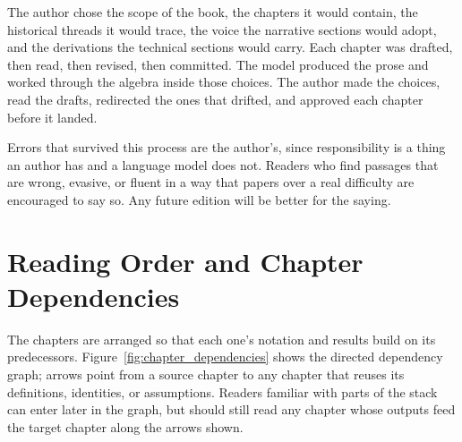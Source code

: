 \documentclass[11pt,a4paper,openany]{book}
\begin{document}
The author chose the scope of the book, the chapters it would
contain, the historical threads it would trace, the voice the
narrative sections would adopt, and the derivations the technical
sections would carry. Each chapter was drafted, then read, then
revised, then committed. The model produced the prose and worked
through the algebra inside those choices. The author made the
choices, read the drafts, redirected the ones that drifted, and
approved each chapter before it landed.

Errors that survived this process are the author's, since
responsibility is a thing an author has and a language model does
not. Readers who find passages that are wrong, evasive, or fluent
in a way that papers over a real difficulty are encouraged to say
so. Any future edition will be better for the saying.

\section*{Reading Order and Chapter Dependencies}

The chapters are arranged so that each one's notation and results
build on its predecessors. Figure~\ref{fig:chapter_dependencies}
shows the directed dependency graph; arrows point from a source
chapter to any chapter that reuses its definitions, identities, or
assumptions. Readers familiar with parts of the stack can enter
later in the graph, but should still read any chapter whose
outputs feed the target chapter along the arrows shown.



\mainmatter




























\backmatter




\end{document}
